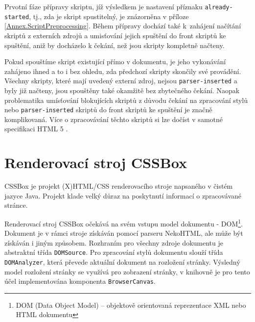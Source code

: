 Prvotní fáze přípravy skriptu, jíž výsledkem je nastavení příznaku \texttt{already-started}, tj., zda je skript spustitelný, je znázorněna v příloze \ref{Annex.ScriptPreprocessing}. Během přípravy dochází také k~zahájení načítání skriptů z externích zdrojů a umisťování jejich spuštění do front skriptů ke spuštění, aniž by docházelo k čekání, než jsou skripty kompletně načteny. 

Pokud spouštíme skript existující přímo v dokumentu, je jeho vykonávání zahájeno ihned a to i bez ohledu, zda předchozí skripty skončily své provádění. Všechny skripty, které mají uvedený externí zdroj, nejsou \texttt{parser-inserted} a byly již načteny, jsou spouštěny také okamžitě bez zbytečného čekání. Naopak problematika umísťování blokujících skriptů z důvodu čekání na zpracování stylů nebo \texttt{parser-inserted} skriptů do front skriptů ke spuštění je značně komplikovaná. Více o zpracovávání těchto skriptů si lze dočíst v samotné specifikaci HTML 5 \cite{Bibliography.HTML5.Scripting}.

\section{Renderovací stroj CSSBox}
\label{Chapter.DependenciesAnalysis.CSSBox}

CSSBox je projekt (X)HTML/CSS renderovacího stroje napsaného v čistém jazyce Java. Projekt klade velký důraz na poskytnutí informací o zpracovávané stránce.

Renderovací stroj CSSBox očekává na svém vstupu model dokumentu - DOM\footnote{DOM (Data Object Model) -- objektově orientovaná reprezentace XML nebo HTML dokumentu}. Dokument je v rámci stroje získáván pomocí parseru NekoHTML, ale může být získáván i jiným způsobem. Rozhraním pro všechny zdroje dokumentu je abstraktní třída \texttt{DOMSource}. Pro zpracování stylů dokumentu slouží třída \texttt{DOMAnalyzer}, která převede aktuální dokument na rozložení stránky. Výsledný model rozložení stránky se využívá pro zobrazení stránky, v knihovně je pro tento účel implementována komponenta \texttt{BrowserCanvas}.

